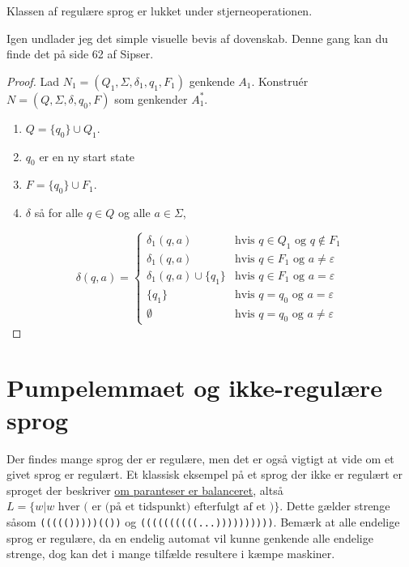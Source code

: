 \begin{theorem}
Klassen af regulære sprog er lukket under stjerneoperationen.
\end{theorem}

Igen undlader jeg det simple visuelle bevis af dovenskab. Denne gang kan du finde det på side 62 af Sipser.

\begin{proof}
Lad $N_1 = (Q_1, \Sigma, \delta_1, q_1, F_1)$ genkende $A_1$.
Konstruér $N = (Q, \Sigma, \delta, q_0, F)$ som genkender $A_1^*$.

\begin{enumerate}
    \item $Q = \{q_0\} \cup Q_1$.
    \item $q_{0}$ er en ny start state
    \item $F = \{q_0\} \cup F_1$.
  \item  $\delta$ så for alle $q \in Q$ og alle $a \in \Sigma$,
\end{enumerate}
\[
\delta(q, a) = \begin{cases}
\delta_1(q, a) & \text{hvis } q \in Q_1 \text{ og } q \notin F_1 \\
\delta_1(q, a) & \text{hvis } q \in F_1 \text{ og } a \neq \varepsilon \\
\delta_1(q, a) \cup \{q_1\} & \text{hvis } q \in F_1 \text{ og } a = \varepsilon \\
\{q_1\} & \text{hvis } q = q_0 \text{ og } a = \varepsilon \\
\emptyset & \text{hvis } q = q_0 \text{ og } a \neq \varepsilon
\end{cases}
\]
\end{proof}

\newpage
\section{Pumpelemmaet og ikke-regulære sprog}

Der findes mange sprog der er regulære, men det er også vigtigt at vide om et givet sprog er regulært. Et klassisk eksempel på et sprog der ikke er regulært er sproget der beskriver \href{https://www.hackerrank.com/challenges/balanced-brackets/problem}{om paranteser er balanceret}, altså $L = \{w | w \text{ hver ( er (på et tidspunkt) efterfulgt af et )}\}$. Dette gælder strenge såsom \texttt{((((()))))(())} og \texttt{((((((((((...))))))))))}. Bemærk at alle endelige sprog er regulære, da en endelig automat vil kunne genkende alle endelige strenge, dog kan det i mange tilfælde resultere i kæmpe maskiner.

